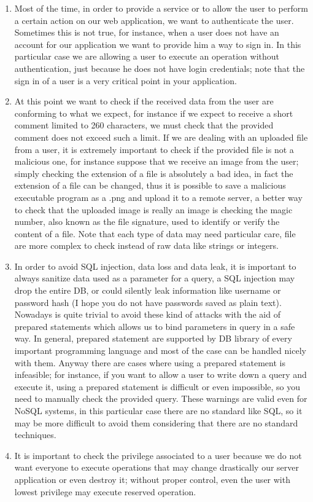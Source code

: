 \begin{enumerate}
	\item	Most of the time, in order to provide a service or to allow the user to perform a certain action on our web application, we want to authenticate the user. Sometimes this is not true, for instance, when a user does not have an account for our application we want to provide him a way to sign in. In this particular case we are allowing a user to execute an operation without authentication, just because he does not have login credentials; note that the sign in of a user is a very critical point in your application.
	\item At this point we want to check if the received data from the user are conforming to what we expect, for instance if we expect to receive a short comment limited to 260 characters, we must check that the provided comment does not exceed such a limit. If we are dealing with an uploaded file from a user, it is extremely important to check if the provided file is not a malicious one, for instance suppose that we receive an image from the user; simply checking the extension of a file is absolutely a bad idea, in fact the extension of a file can be changed, thus it is possible to save a malicious executable program as a .png and upload it to a remote server, a better way to check that the uploaded image is really an image is checking the magic number, also known as the file signature, used to identify or verify the content of a file.
	Note that each type of data may need particular care, file are more complex to check instead of raw data like strings or integers.
	\item In order to avoid SQL injection, data loss and data leak, it is important to always sanitize data used as a parameter for a query, a SQL injection may drop the entire DB, or could silently leak information like username or password hash (I hope you do not have passwords saved as plain text). Nowadays is quite trivial to avoid these kind of attacks with the aid of prepared statements which allows us to bind parameters in query in a safe way.
	In general, prepared statement are supported by DB library of every important programming language and most of the case can be handled nicely with them.
	Anyway there are cases where using a prepared statement is infeasible; for instance, if you want to allow a user to write down a query and execute it, using a prepared statement is difficult or even impossible, so you need to manually check the provided query.
	These warnings are valid even for NoSQL systems, in this particular case there are no standard like SQL, so it may be more difficult to avoid them considering that there are no standard techniques.
	\item It is important to check the privilege associated to a user because we do not want everyone to execute operations that may change drastically our server application or even destroy it; without proper control, even the user with lowest privilege may execute reserved operation.
\end{enumerate}

